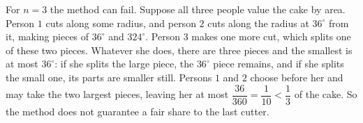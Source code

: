 For $n=3$ the method can fail. Suppose all three people value the cake by area. Person $1$ cuts along some radius, and person $2$ cuts along the radius at $36^\circ$ from it, making pieces of $36^\circ$ and $324^\circ$. Person $3$ makes one more cut, which splits one of these two pieces. Whatever she does, there are three pieces and the smallest is at most $36^\circ$: if she splits the large piece, the $36^\circ$ piece remains, and if she splits the small one, its parts are smaller still. Persons $1$ and $2$ choose before her and may take the two largest pieces, leaving her at most $\dfrac{36}{360}=\dfrac{1}{10}<\dfrac{1}{3}$ of the cake. So the method does not guarantee a fair share to the last cutter.
